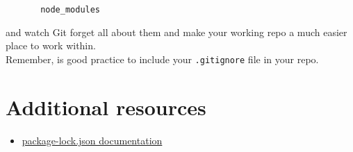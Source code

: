 	\begin{verbatim}
       node_modules
	\end{verbatim}

and watch Git forget all about them and make your working repo a much easier place to work within.
\\

Remember, is good practice to include your \texttt{.gitignore} file in your repo.
\\


\section{Additional resources}

\begin{itemize}[leftmargin=*]
    \item \href{https://docs.npmjs.com/files/package-lock.json}{package-lock.json documentation}
\end{itemize}
